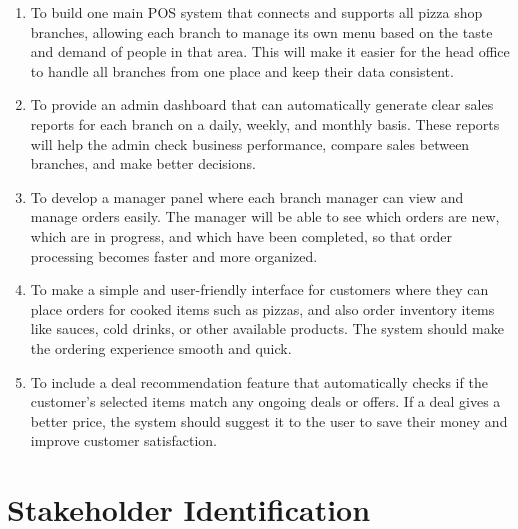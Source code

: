 \documentclass{article}
\begin{document}
\begin{enumerate}
    \item To build one main POS system that connects and supports all pizza shop branches, allowing each branch to manage its own menu based on the taste and demand of people in that area. 
    This will make it easier for the head office to handle all branches from one place and keep their data consistent.
    
    \item To provide an admin dashboard that can automatically generate clear sales reports for each branch on a daily, weekly, and monthly basis. 
    These reports will help the admin check business performance, compare sales between branches, and make better decisions.
    
    \item To develop a manager panel where each branch manager can view and manage orders easily. 
    The manager will be able to see which orders are new, which are in progress, and which have been completed, so that order processing becomes faster and more organized.
    
    \item To make a simple and user-friendly interface for customers where they can place orders for cooked items such as pizzas, and also order inventory items like sauces, cold drinks, or other available products. 
    The system should make the ordering experience smooth and quick.
    
    \item To include a deal recommendation feature that automatically checks if the customer’s selected items match any ongoing deals or offers. 
    If a deal gives a better price, the system should suggest it to the user to save their money and improve customer satisfaction.
\end{enumerate}


\section{Stakeholder Identification}
\end{document}
